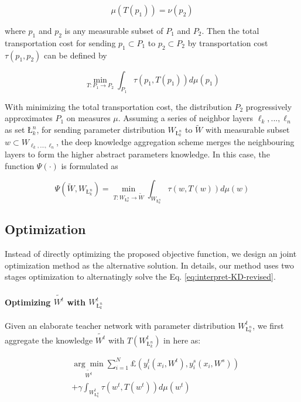 \documentclass[10pt,twocolumn,letterpaper]{article}
\begin{document}
\begin{equation}
\mu(T(p_1)) = \nu(p_2)
\label{eq:layer-ag}
\end{equation}

where $p_1$ and $p_2$ is any measurable subset of $P_1$ and $P_2$.
Then the total transportation cost for sending $p_1 \subset P_1$ to $p_2 \subset P_2$
by transportation cost $\tau(p_1,p_2)$
can be defined by

\begin{equation}
\min_{T:P_1 \rightarrow P_2}\int_{P_1}\tau(p_1,T(p_1))d\mu(p_1)
\label{eq:layer-ag-tp}
\end{equation}

With minimizing the total transportation cost,
the distribution $P_2$ progressively approximates $P_1$ on measures $\mu$.
Assuming a series of neighbor layers ${\ell_k, ..., \ell_n}$ as set $\textit{\L}_k^n$,
for sending parameter distribution $W_{\textit{\L}_k^n}$ to $\tilde{W}$
with measurable subset $w \subset W_{\ell_k, ..., \ell_n}$,
the deep knowledge aggregation scheme merges the neighbouring layers
to form the higher abstract parameters knowledge.
In this case,
the function $\Psi(\cdot)$ is formulated as

\begin{equation}
\Psi(\tilde{W}, W_{\textit{\L}_k^n}) = \min_{T:W_{\textit{\L}_k^n} \rightarrow \tilde{W}}\int_{W_{\textit{\L}_k^n}}\tau(w,T(w))d\mu(w)
\label{eq:layer-ag-details}
\end{equation}



\subsection{Optimization} \label{3dot4}
Instead of directly optimizing the proposed objective function,
we design an joint optimization method as the alternative solution.
In details, our method uses two stages optimization
to alternatingly solve the Eq. \ref{eq:interpret-KD-revised}.

\paragraph{Optimizing $\tilde{W^t}$ with $W^t_{\textit{\L}_k^n}$}
Given an elaborate teacher network with parameter distribution $W^t_{\textit{\L}_k^n}$,
we first aggregate the knowledge $\tilde{W^t}$ with $T({W^t_{\textit{\L}_k^n}})$ in here
as:

\begin{equation}
\begin{split}
&\underset{\tilde{W^t}}{\arg\min} \sum_{i=1}^{N}\pounds(y_{i}^{t}(x_i, W^t), y_{i}^{s}(x_i, W^s))\\
&+ \gamma \int_{W_{\textit{\L}_k^n}^t}\tau(w^t,T(w^t))d\mu(w^t)
\label{eq:interpret-KD-revised-solve}
\end{split}
\end{equation}
\end{document}
